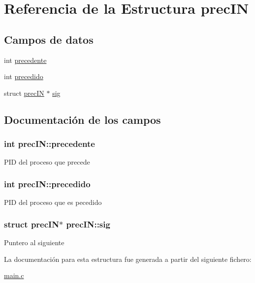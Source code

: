 \hypertarget{structprecIN}{\section{Referencia de la Estructura prec\-I\-N}
\label{structprecIN}
}
\subsection*{Campos de datos}
\begin{DoxyCompactItemize}
\item 
int \hyperlink{structprecIN_a34b59a54f8c2ccac97e781b230f534d7}{precedente}
\item 
int \hyperlink{structprecIN_ada43c3bfc9d9a32204e07a20de35e439}{precedido}
\item 
struct \hyperlink{structprecIN}{prec\-I\-N} $\ast$ \hyperlink{structprecIN_a6a70358918e59acdca110802c95f0784}{sig}
\end{DoxyCompactItemize}


\subsection{Documentación de los campos}
\hypertarget{structprecIN_a34b59a54f8c2ccac97e781b230f534d7}{
\subsubsection[{precedente}]{\setlength{\rightskip}{0pt plus 5cm}int prec\-I\-N\-::precedente}}\label{structprecIN_a34b59a54f8c2ccac97e781b230f534d7}
P\-I\-D del proceso que precede \hypertarget{structprecIN_ada43c3bfc9d9a32204e07a20de35e439}{
\subsubsection[{precedido}]{\setlength{\rightskip}{0pt plus 5cm}int prec\-I\-N\-::precedido}}\label{structprecIN_ada43c3bfc9d9a32204e07a20de35e439}
P\-I\-D del proceso que es pecedido \hypertarget{structprecIN_a6a70358918e59acdca110802c95f0784}{
\subsubsection[{sig}]{\setlength{\rightskip}{0pt plus 5cm}struct {\bf prec\-I\-N}$\ast$ prec\-I\-N\-::sig}}\label{structprecIN_a6a70358918e59acdca110802c95f0784}
Puntero al siguiente 

La documentación para esta estructura fue generada a partir del siguiente fichero\-:\begin{DoxyCompactItemize}
\item 
\hyperlink{main_8c}{main.\-c}\end{DoxyCompactItemize}
